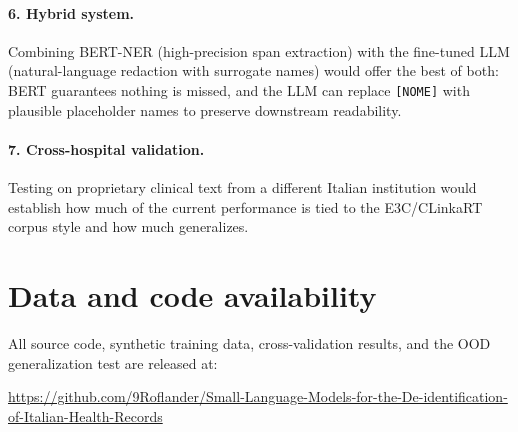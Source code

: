 \documentclass[11pt,a4paper]{article}
\begin{document}
\paragraph{6. Hybrid system.} Combining BERT-NER (high-precision span extraction) with the fine-tuned LLM (natural-language redaction with surrogate names) would offer the best of both: BERT guarantees nothing is missed, and the LLM can replace \texttt{[NOME]} with plausible placeholder names to preserve downstream readability.

\paragraph{7. Cross-hospital validation.} Testing on proprietary clinical text from a different Italian institution would establish how much of the current performance is tied to the E3C/CLinkaRT corpus style and how much generalizes.

\section*{Data and code availability}

All source code, synthetic training data, cross-validation results, and the OOD generalization test are released at:
\begin{center}
\url{https://github.com/9Roflander/Small-Language-Models-for-the-De-identification-of-Italian-Health-Records}
\end{center}
\end{document}
